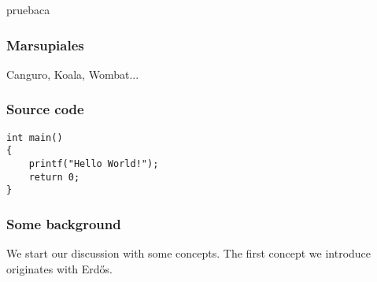 \documentclass{beamer}
\begin{document}
\begin{frame}[plain]
    \titlepage pruebaca
\end{frame}


\begin{frame}
    \frametitle{Marsupiales}
    Canguro, Koala, Wombat...
\end{frame}

\begin{frame}[fragile]
\frametitle{Source code}

\begin{lstlisting}[caption=First C example]
int main()
{
    printf("Hello World!");
    return 0;
}
\end{lstlisting}
\end{frame}

\begin{frame}
\frametitle{Some background}
We start our discussion with some concepts.
\pause
The first concept we introduce originates with Erd\H os.
\end{frame}
\end{document}
